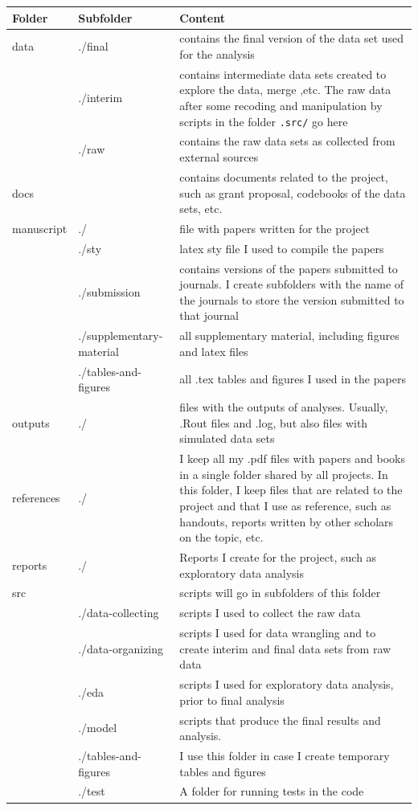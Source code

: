 \documentclass[a4paper]{article}
\begin{document}
\begin{center}
\begin{tabular}{llp{9cm}}
\hline
\hline
Folder & Subfolder & Content\\
\hline
\hline
data & ./final & contains the final version of the data set used for the analysis\\
 & ./interim & contains intermediate data sets created to explore the data, merge ,etc. The raw data after some recoding and manipulation by scripts in the folder \texttt{.src/} go here\\
 & ./raw & contains the raw data sets as collected from external sources\\
\hline
docs &  & contains documents related to the project, such as grant proposal, codebooks of the data sets, etc.\\
\hline
manuscript & ./ & file with papers written for the project\\
 & ./sty & latex sty file I used to compile the papers\\
 & ./submission & contains versions of the papers submitted to journals. I create subfolders with the name of the journals to store the version submitted to that journal\\
 & ./supplementary-material & all supplementary material, including figures and latex files\\
 & ./tables-and-figures & all .tex tables and figures I used in the papers\\
\hline
outputs & ./ & files with the outputs of analyses. Usually, .Rout files and .log, but also files with simulated data sets\\
\hline
references & ./ & I keep all my .pdf files with papers and books in a single folder shared by all projects. In this folder, I keep files that are related to the project and that I use as reference, such as handouts, reports written by other scholars on the topic, etc.\\
\hline
reports & ./ & Reports I create for the project, such as exploratory data analysis\\
\hline
src &  & scripts will go in subfolders of this folder\\
 & ./data-collecting & scripts I used to collect the raw data\\
 & ./data-organizing & scripts I used for data wrangling and to create interim and final data sets from raw data\\
 & ./eda & scripts I used for exploratory data analysis, prior to final analysis\\
 & ./model & scripts that produce the final results and analysis.\\
 & ./tables-and-figures & I use this folder in case I create temporary tables and figures\\
 & ./test & A folder for running tests in the code\\
\hline
\hline
\end{tabular}
\end{center}
\end{document}
